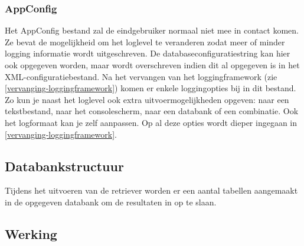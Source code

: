\subsubsection{AppConfig}
Het AppConfig bestand zal de eindgebruiker normaal niet mee in contact komen.
Ze bevat de mogelijkheid om het loglevel te veranderen zodat meer of minder logging informatie wordt uitgeschreven.
De databaseconfiguratiestring kan hier ook opgegeven worden, maar wordt overschreven indien dit al opgegeven is in het XML-configuratiebestand.
Na het vervangen van het loggingframework (zie \cref{vervanging-loggingframework}) komen er enkele loggingopties bij in dit bestand.
Zo kun je naast het loglevel ook extra uitvoermogelijkheden opgeven: naar een tekstbestand, naar het consolescherm, naar een databank of een combinatie.
Ook het logformaat kan je zelf aanpassen. Op al deze opties wordt dieper ingegaan in \cref{vervanging-loggingframework}.


\subsection{Databankstructuur}
\label{snmp-data-retriever-db}
Tijdens het uitvoeren van de retriever worden er een aantal tabellen aangemaakt in de opgegeven databank om de resultaten in op te slaan.




\subsection{Werking}


